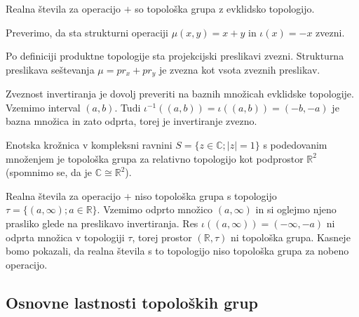 \documentclass[mat1]{fmfdelo}
\newcommand{\R}{\mathbb R}
\newcommand{\C}{\mathbb C}
\begin{document}
\begin{primer}
	Realna števila za operacijo $+$ so topološka grupa z evklidsko topologijo.
	
	Preverimo, da sta strukturni operaciji $\mu(x, y) = x + y$ in $\iota(x) = -x$ zvezni.
	
	Po definiciji produktne topologije sta projekcijski preslikavi zvezni. Strukturna preslikava seštevanja $\mu = pr_x + pr_y$ je zvezna kot vsota zveznih preslikav.
	
	Zveznost invertiranja je dovolj preveriti na baznih množicah evklidske topologije. Vzemimo interval $(a, b)$. Tudi $\iota^{-1}((a, b)) = \iota((a, b)) = (-b, -a)$ je bazna množica in zato odprta, torej je invertiranje zvezno.
\end{primer}

\begin{primer}
	Enotska krožnica v kompleksni ravnini $S = \lbrace z \in \C ; |z| = 1 \rbrace$ s podedovanim množenjem je topološka grupa za relativno topologijo kot podprostor $\R^2$ (spomnimo se, da je $\C \cong \R^2$).
\end{primer}

\begin{primer}
	Realna števila za operacijo $+$ niso topološka grupa s topologijo $\tau = \lbrace (a, \infty) ; a \in \R \rbrace$. Vzemimo odprto množico $(a, \infty)$ in si oglejmo njeno prasliko glede na preslikavo invertiranja. Res $\iota((a, \infty)) = (-\infty, -a)$ ni odprta množica v topologiji $\tau$, torej prostor $(\R, \tau)$ ni topološka grupa. Kasneje bomo pokazali, da realna števila s to topologijo niso topološka grupa za nobeno operacijo.
%	
\end{primer}

\subsection{Osnovne lastnosti topoloških grup}
\end{document}
